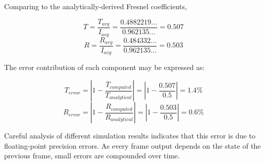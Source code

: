 Comparing to the analytically-derived Fresnel coefficients,

\begin{equation}
T = \frac{T_{avg}}{I_{avg}} = \frac{0.4882219...}{0.962135...} = 0.507
\end{equation}
\begin{equation}
R = \frac{R_{avg}}{I_{avg}} = \frac{0.484332...}{0.962135...} = 0.503
\end{equation}

The error contribution of each component may be expressed as:

\begin{equation}
T_{error} = |1 - \frac{T_{computed}}{T_{analytical}}| = |1 - \frac{0.507}{0.5}| = 1.4\%
\end{equation}
\begin{equation}
R_{error} = |1 - \frac{R_{computed}}{R_{analytical}}| = |1 - \frac{0.503}{0.5}| = 0.6\%
\end{equation}

Careful analysis of different simulation results indicates that this error is due to floating-point precision errors. As every frame output depends on the state of the previous frame, small errors are compounded over time. 




